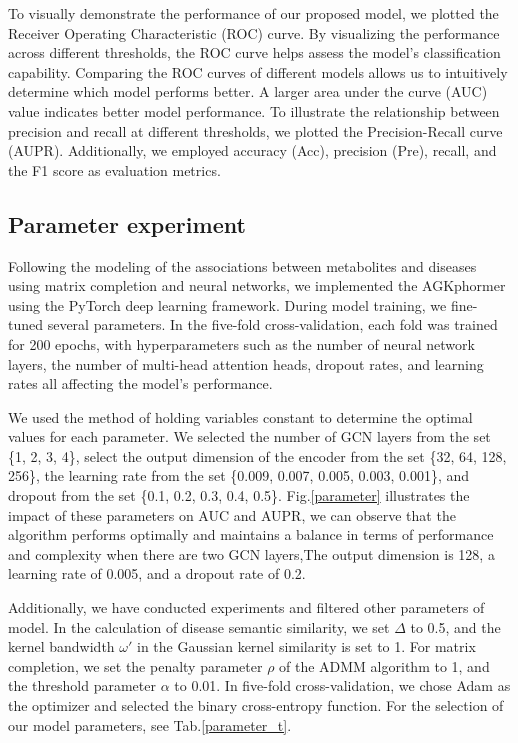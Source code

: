 \documentclass[a4paper,fleqn]{cas-dc}
\begin{document}
To visually demonstrate the performance of our proposed model, we plotted the Receiver Operating Characteristic (ROC) curve. By visualizing the performance across different thresholds, the ROC curve helps assess the model's classification capability. Comparing the ROC curves of different models allows us to intuitively determine which model performs better. A larger area under the curve (AUC) value indicates better model performance.
To illustrate the relationship between precision and recall at different thresholds, we plotted the Precision-Recall curve (AUPR).
Additionally, we employed accuracy (Acc), precision (Pre), recall, and the F1 score as evaluation metrics.



\subsection{Parameter experiment}

Following the modeling of the associations between metabolites and diseases using matrix completion and neural networks, we implemented the AGKphormer using the PyTorch deep learning framework. During model training, we fine-tuned several parameters. In the five-fold cross-validation, each fold was trained for 200 epochs, with hyperparameters such as the number of neural network layers, the number of multi-head attention heads, dropout rates, and learning rates all affecting the model's performance.

We used the method of holding variables constant to determine the optimal values for each parameter. We selected the number of GCN layers from the set \{1, 2, 3, 4\}, select the output dimension of the encoder from the set \{32, 64, 128, 256\}, the learning rate from the set \{0.009, 0.007, 0.005, 0.003, 0.001\}, and dropout from the set \{0.1, 0.2, 0.3, 0.4, 0.5\}. Fig.\ref{parameter} illustrates the impact of these parameters on AUC and AUPR, we can observe that the algorithm performs optimally and maintains a balance in terms of performance and complexity when there are two GCN layers,The output dimension is 128, a learning rate of 0.005, and a dropout rate of 0.2. 

Additionally, we have conducted experiments and filtered other parameters of model. In the calculation of disease semantic similarity, we set \(\Delta\) to 0.5, and the kernel bandwidth \({\omega}'\) in the Gaussian kernel similarity is set to 1. For matrix completion, we set the penalty parameter \(\rho\) of the ADMM algorithm to 1, and the threshold parameter \(\alpha\) to 0.01. In five-fold cross-validation, we chose Adam as the optimizer and selected the binary cross-entropy function. For the selection of our model parameters, see Tab.\ref{parameter_t}.
\end{document}
